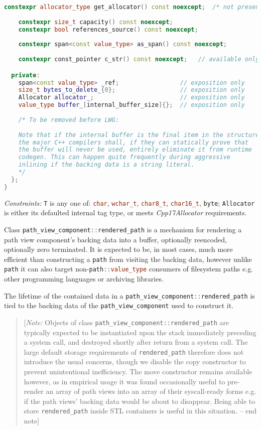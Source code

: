 \documentclass[11pt]{article}
\newcommand{\code}[2][cpp]{\lstinline[language=#1,basicstyle=\small\ttfamily]{#2}}
\newcommand{\desc}[1]{\textit{#1}}
\newcommand{\constraints}{\desc{Constraints: }}
\newcommand{\note}[1]{\begin{quote}[\textit{Note:} #1 -- end note]\end{quote}}
\begin{document}
\begin{lstlisting}[language=cpp]
    constexpr allocator_type get_allocator() const noexcept;  /* not present if default_rendered_path_allocator tag type was used */
    
    constexpr size_t capacity() const noexcept;
    constexpr bool references_source() const noexcept;
    
    constexpr span<const value_type> as_span() const noexcept;
    
    constexpr const_pointer c_str() const noexcept;   // available only if zero_terminated and non-byte backing

  private:
    span<const value_type> _ref;                 // exposition only
    size_t bytes_to_delete_{0};                  // exposition only
    Allocator allocator_;                        // exposition only
    value_type buffer_[internal_buffer_size]{};  // exposition only
    
    /* To be removed before LWG:
    
    Note that if the internal buffer is the final item in the structure,
    the major C++ compilers shall, if they can statically prove that
    the buffer will never be used, entirely eliminate it from runtime
    codegen. This can happen quite frequently during aggressive
    inlining if the backing data is a string literal.
    */
  };
}
\end{lstlisting}

\constraints \code{T} is any one of: \code{char}, \code{wchar_t}, \code{char8_t}, \code{char16_t}, \code{byte}; \code{Allocator} is either its defaulted internal tag type, or meets \emph{Cpp17Allocator} requirements.

Class \code{path_view_component::rendered_path} is a mechanism for rendering a path view component's backing data into a buffer, optionally reencoded, optionally zero terminated. It is expected to be, in most cases, much more efficient than constructing a \code{path} from visiting the backing data, however unlike \code{path} it can also target non-\code{path::value_type} consumers of filesystem paths e.g. other programming languages or archiving libraries.

The lifetime of the contained data in a \code{path_view_component::rendered_path} is tied to the backing data of the \code{path_view_component} used to construct it.

\color{black}

\note{Objects of class \code{path_view_component::rendered_path} are typically expected to be instantiated upon the stack immediately preceding a system call, and destroyed shortly after return from a system call. The large default storage requirements of \code{rendered_path} therefore does not introduce the usual concerns, though we disable the copy constructor to prevent unintentional inefficiency. The move constructor remains available however, as in empirical usage it was found occasionally useful to pre-render an array of path views into an array of their syscall-ready forms e.g. if the path views' backing data would be about to disappear. Being able to store \code{rendered_path} inside STL containers is useful in this situation.}
\end{document}
